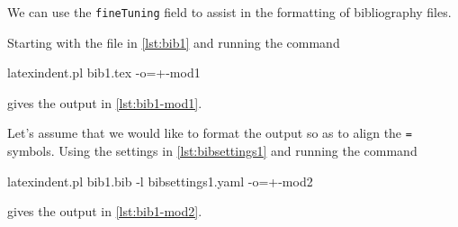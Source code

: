  \begin{example}
 We can use the \texttt{fineTuning} field to assist in the formatting of bibliography
 files.  
   

 Starting with the file in \cref{lst:bib1} and running the command

 \begin{commandshell}
latexindent.pl bib1.tex -o=+-mod1 
   \end{commandshell}

 gives the output in \cref{lst:bib1-mod1}.

 \begin{widepage}
  \begin{cmhtcbraster}[raster column skip=.01\linewidth]
  \end{cmhtcbraster}
 \end{widepage}

 Let's assume that we would like to format the output so as to align the \texttt{=}
 symbols. Using the settings in \cref{lst:bibsettings1} and running the command

 \begin{commandshell}
latexindent.pl bib1.bib -l bibsettings1.yaml -o=+-mod2 
     \end{commandshell}

 gives the output in \cref{lst:bib1-mod2}.


\end{example}
